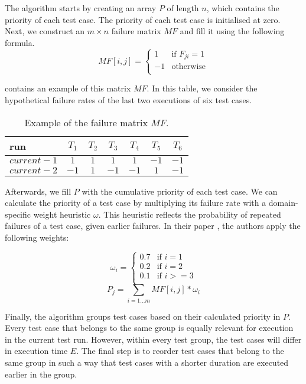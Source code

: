 \noindent The algorithm starts by creating an array $P$ of length $n$, which contains the priority of each test case. The priority of each test case is initialised at zero. Next, we construct an $m \times n$ failure matrix $MF$ and fill it using the following formula.
\[
	MF[i, j] = \left\{
	\begin{array}{rl}
		1 & \text{if } F_{ji} = 1 \\
		-1 & \text{otherwise} \\
		\end{array}
	\right.
\]

\noindent {} contains an example of this matrix $MF$. In this table, we consider the hypothetical failure rates of the last two executions of six test cases.

\begin{table}[h]
\centering
\begin{tabular}{| l || c | c | c | c | c | c |}
	\hline
	\textbf{run} & \textbf{$T_1$} & \textbf{$T_2$} & \textbf{$T_3$} & \textbf{$T_4$} & \textbf{$T_5$} & \textbf{$T_6$}\\\hline
	$current - 1$ & $1$ & $1$ & $1$ & $1$ & $-1$ & $-1$\\
	$current - 2$ & $-1$ & $1$ & $-1$ & $-1$ & $1$ & $-1$\\
	\hline
\end{tabular}
\caption{Example of the failure matrix $MF$.}
\label{tbl:rocket-failurematrix}
\end{table}

\noindent Afterwards, we fill $P$ with the cumulative priority of each test case. We can calculate the priority of a test case by multiplying its failure rate with a domain-specific weight heuristic $\omega$. This heuristic reflects the probability of repeated failures of a test case, given earlier failures. In their paper \cite{6676952}, the authors apply the following weights:

\[
	\omega_i = \left.
	\begin{cases}
		0.7 & \text{if } i = 1 \\
		0.2 & \text{if } i = 2 \\
		0.1 & \text{if } i >= 3 \\
	\end{cases}
	\right.
\]
$$P_j = \sum_{i = 1 \dots m} MF[i, j] * \omega_i$$

\noindent Finally, the algorithm groups test cases based on their calculated priority in $P$. Every test case that belongs to the same group is equally relevant for execution in the current test run. However, within every test group, the test cases will differ in execution time $E$. The final step is to reorder test cases that belong to the same group in such a way that test cases with a shorter duration are executed earlier in the group.

